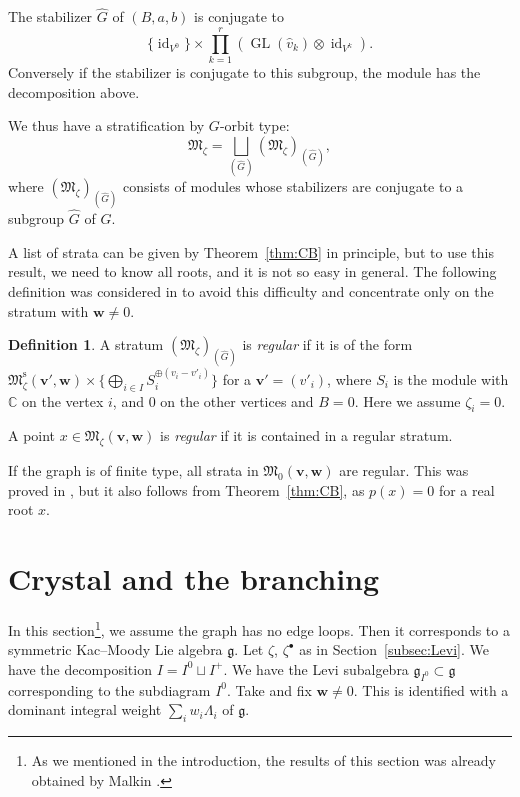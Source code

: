 \documentclass[10pt,a4paper]{amsart}
\theoremstyle{definition}
\newtheorem{Definition}[equation]{Definition}
\numberwithin{equation}{section}
\newcommand{\thmref}[1]{Theorem~\ref{#1}}
\newcommand{\subsecref}[1]{Section~\ref{#1}}
\newcommand{\C}{{\mathbb C}}
\newcommand{\GL}{\operatorname{GL}}
\newcommand{\id}{\operatorname{id}}
\newcommand{\M}{{\mathfrak M}} %
\newcommand{\Mreg}{\M^{\operatorname{s}}}
\newcommand{\bv}{{\mathbf v}} %
\newcommand{\bw}{{\mathbf w}} %
\begin{document}
The stabilizer $\widehat G$ of $(B,a,b)$ is conjugate to
\[
   \{ \id_{V^0} \} \times
   \prod_{k=1}^r \left(\GL(\widehat{v}_k)\otimes \id_{V^k}\right).
\]
Conversely if the stabilizer is conjugate to this subgroup, the module
has the decomposition above.

We thus have a stratif\/ication by $G$-orbit type:
\begin{equation*}
   \M_\zeta = \bigsqcup_{(\widehat G)} (\M_\zeta)_{(\widehat G)},
\end{equation*}
where $(\M_\zeta)_{(\widehat G)}$ consists of modules whose
stabilizers are conjugate to a subgroup $\widehat G$ of $G$.

A list of strata can be given by \thmref{thm:CB} in principle, but to
use this result, we need to know all roots, and it is not so easy in
general.
%
The following def\/inition was considered in \cite[2.6.4]{Na-qaff} to
avoid this dif\/f\/iculty and concentrate only on the stratum with $\bw
\neq 0$.

\begin{Definition}
  A stratum $(\M_\zeta)_{(\widehat G)}$ is {\it regular\/} if it is of
  the form $\Mreg_\zeta(\bv',\bw)\times\{ \bigoplus_{i\in I}
  S_i^{\oplus (v_i - v'_i)}\}$ for a $\bv' = (v'_i)$, where $S_i$ is
  the module with $\C$ on the vertex $i$, and $0$ on the other
  vertices and $B = 0$. Here we assume $\zeta_i = 0$.

  A point $x\in\M_\zeta(\bv,\bw)$ is {\it regular\/} if it is contained in
  a regular stratum.
\end{Definition}

If the graph is of f\/inite type, all strata in $\M_0(\bv,\bw)$ are
regular. This was proved in \cite[6.7]{Na-quiver}, but it also follows
from \thmref{thm:CB}, as $p(x) = 0$ for a real root $x$.


\section{Crystal and the branching}\label{sec:crystal}

In this section\footnote{As we mentioned in the introduction, the
  results of this section was already obtained by Malkin
  \cite{Malkin}.}, we assume the graph has no edge loops. Then it
corresponds to a symmetric Kac--Moody Lie algebra $\mathfrak g$.
%
Let $\zeta$, $\zeta^\bullet$ as in \subsecref{subsec:Levi}. We have the
decomposition $I = I^0\sqcup I^+$. We have the Levi subalgebra
$\mathfrak g_{I^0}\subset\mathfrak g$ corresponding to the subdiagram
$I^0$.
%
Take and f\/ix $\bw\neq 0$. This is identif\/ied with a dominant integral
weight $\sum_i w_i\Lambda_i$ of $\mathfrak g$.
\end{document}
